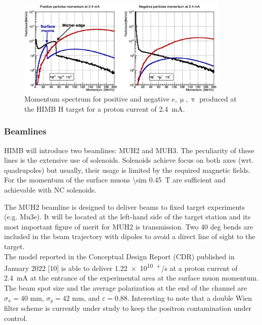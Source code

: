 \begin{refsection}
        \begin{figure}[h]
            \centering
            \includegraphics[width=0.9\textwidth]{Figures/Introduction/himb_momenta.png}
            \caption[HIMB momentum spectrum]{Momentum spectrum for positive and negative $e,\upmu,\uppi$ produced at the HIMB H target for a proton current of \SI{2.4}{mA}.}
            \label{fig:himb:momenta}
        \end{figure}
        
        \subsubsection{Beamlines}
        HIMB will introduce two beamlines: MUH2 and MUH3.
        The peculiarity of these lines is the extensive use of solenoids.
        Solenoids achieve focus on both axes (wrt. quadrupoles) but usually, their usage is limited by the required magnetic fields. 
        For the momentum of the surface muons \SI{\sim 0.45}{T} are sufficient and achievable with NC solenoids. 
        
        The MUH2 beamline is designed to deliver beams to fixed target experiments (e.g. Mu3e). It will be located at the left-hand side of the target station and its most important figure of merit for MUH2 is transmission.
        Two 40 deg bends are included in the beam trajectory with dipoles to avoid a direct line of sight to the target.\\
        The model reported in the Conceptual Design Report (CDR) published in January 2022 [10] is able to deliver \SI{1.22e10}{\upmu^+/s} at a proton current of \SI{2.4}{mA} at the entrance of the experimental area at the surface muon momentum. 
        The beam spot size and the average polarization at the end of the channel are $\sigma_x = 40$ mm, $\sigma_y = 42$ mm, and $\varepsilon = 0.88$.
        Interesting to note that a double Wien filter scheme is currently under study to keep the positron contamination under control.
 

\end{refsection}
